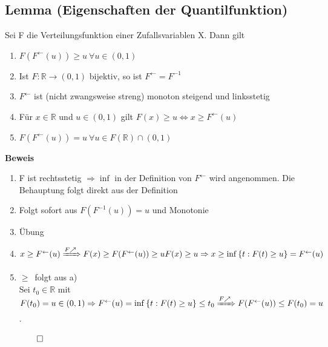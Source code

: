 \documentclass[german,10pt,oneside, fleqn, a4paper]{article}
\newcommand {\R}	{\mathbb{R}}
\newcommand{\Ra}	{\Rightarrow}
\newcommand{\LRa}{\Leftrightarrow}
\newcommand{\ra}{\rightarrow}
\newcommand{\brac}[1]{\left\lbrace #1\right\rbrace}
\newcommand{\QED}{\begin{flushright}$\qed$\end{flushright}}
\newcommand{\beweis}{\textbf{Beweis}\\}
\newcommand{\1}[1]{1_{#1}}
\newcommand{\2}[1]{\1{\brac{#1}}}
\newcommand{\inv}{^\leftarrow}
\begin{document}
\subsection{Lemma (Eigenschaften der Quantilfunktion)}
\label{3.6}
Sei F die Verteilungsfunktion einer Zufallsvariablen X. Dann gilt\begin{enumerate}[label=(\alph*)]
\item $F(F\inv(u))\geq u\ \forall u\in(0,1)$\\
\item Ist $F:\R\ra(0,1)$ bijektiv, so ist $F\inv=F^{-1}$
\item $F\inv$ ist (nicht zwangsweise streng) monoton steigend und linksstetig
\item Für $x\in\R$ und $u\in(0,1)$ gilt $F(x)\geq u \LRa x\geq F\inv(u)$
\item $F(F\inv(u))=u\ \forall u\in F(\R)\cap(0,1)$
\end{enumerate}
\beweis
\begin{enumerate}[label=(\alph*)]
\item F ist rechtsstetig $\Ra\inf$ in der Definition von $F\inv$ wird angenommen. Die Behauptung folgt direkt aus der Definition
\item Folgt sofort aus $F(F^{-1}(u))=u$ und Monotonie
\item Übung
\item $x\geq F\inv(u)\xRightarrow{F\nearrow}F(x)\geq F(F\inv(u))\geq u\\
F(x)\geq u\Ra x\geq\inf\brac{t:F(t)\geq u}=F\inv(u)$
\item \glqq$\geq$\grqq \ folgt aus a)\\
Sei $t_0\in\R$ mit $F(t_0)=u\in(0,1)\\
\Ra F\inv(u)=\inf\brac{t:F(t)\geq u}\leq t_0\\
\xRightarrow{F\nearrow}F(F\inv(u))\leq F(t_0)=u$.\QED
\end{enumerate}
\end{document}
